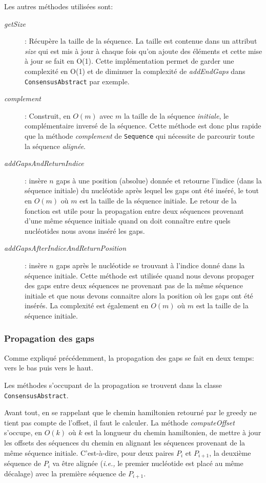 Les autres méthodes utilisées sont:
\begin{description}
	\item[\emph{getSize}]: Récupère la taille de la séquence. La taille est
		contenue dans un attribut \emph{size} qui est mis à jour à chaque fois
		qu'on ajoute des éléments et cette mise à jour se fait en O(1). Cette
		implémentation permet de garder une complexité en O(1) et de diminuer la
		complexité de \emph{addEndGaps} dans \verb|ConsensusAbstract| par
		exemple.
	\item[\emph{complement}]: Construit, en $O(m)$ avec $m$ la taille de la
		séquence \textit{initiale}, le complémentaire inversé de la séquence.
		Cette méthode est donc plus rapide que la méthode \emph{complement} de
		\verb|Sequence| qui nécessite de parcourir toute la séquence
		\textit{alignée}.
	\item[\emph{addGapsAndReturnIndice}]: insère $n$ gaps à
			une position (absolue) donnée et retourne l'indice (dans la séquence
			initiale) du nucléotide après lequel les gaps ont été inséré, le
			tout en $O(m)$ où $m$ est la taille de la séquence initiale. Le
			retour de la fonction est utile pour la propagation entre deux
			séquences provenant d'une même séquence initiale quand on doit
			connaître entre quels nucléotides nous avons inséré les gaps.
	\item[\emph{addGapsAfterIndiceAndReturnPosition}]: insère $n$ gaps après
		le nucléotide se trouvant à l'indice donné dans la séquence initiale.
		Cette méthode est utilisée quand nous devons propager des gaps entre
		deux séquences ne provenant pas de la même séquence initiale et que nous
		devons connaitre alors la position où les gaps ont été insérés. La
		complexité est également en $O(m)$ où $m$ est la taille de la séquence
		initiale.
\end{description}

\subsubsection{Propagation des gaps}
\label{propagation_gaps}

Comme expliqué précédemment, la propagation des gaps se fait en deux temps: vers
le bas puis vers le haut.

Les méthodes s'occupant de la propagation se trouvent dans la classe
\verb|ConsensusAbstract|.

Avant tout, en se rappelant que le chemin hamiltonien retourné par le greedy ne
tient pas compte de l'offset, il faut le calculer. La méthode
\emph{computeOffset} s'occupe, en $O(k)$ où $k$ est la longueur du chemin
hamiltonien, de mettre à jour les offsets des séquences du chemin en alignant
les séquences provenant de la même séquence initiale. C'est-à-dire, pour deux
paires $P_{i}$ et $P_{i + 1}$, la deuxième séquence de $P_{i}$ va être alignée
(\emph{i.e.,} le premier nucléotide est placé au même décalage) avec la première
séquence de $P_{i + 1}$.

